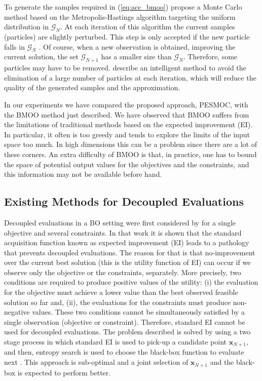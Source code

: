 \documentclass[review,preprint,12pt]{elsarticle}
\begin{document}
To generate the samples required in (\ref{eq:acc_bmoo}) \cite{feliot2015bayesian} propose a Monte Carlo method based
on the Metropolis-Hastings algorithm targeting the uniform distribution in $\mathcal{G}_{N}$. At each iteration of this 
algorithm the current samples (particles) are slightly perturbed. This step is only accepted if the new
particle falls in $\mathcal{G}_{N}$ . Of course, when a new observation is obtained, improving the current solution, 
the set $\mathcal{G}_{N+1}$ has a smaller size than $\mathcal{G}_{N}$. Therefore, some particles may have to be removed. 
\cite{feliot2015bayesian} describe an intelligent method to avoid the elimination of a large number of particles at each 
iteration, which will reduce the quality of the generated samples and the approximation.

In our experiments we have compared the proposed approach, PESMOC, with the BMOO method just described.
We have observed that BMOO suffers from the limitations of traditional methods based on the 
expected improvement (EI). In particular, it often is too greedy and tends to explore the limits of the 
input space too much. In high dimensions this can be a problem since there are a lot of these corners.  
An extra difficulty of BMOO is that, in practice, one has to bound the space of potential output values for the
objectives and the constraints, and this information may not be available before hand.

\subsection{Existing Methods for Decoupled Evaluations}

Decoupled evaluations in a BO setting were first considered by \cite{gelbart2014bayesian} 
for a single objective and several constraints. In that work it is shown that 
the standard acquisition function known as expected improvement
(EI) leads to a pathology that prevents decoupled evaluations. The reason for that is that 
no-improvement over the current best solution (this is the utility function of EI) can occur if we observe 
only the objective or the constraints, separately. More precisely, two conditions are required to produce 
positive values of the utility: (i) the evaluation for the objective must 
achieve a lower value than the best observed feasible solution so far and, (ii), the evaluations 
for the constraints must produce non-negative values. These two conditions 
cannot be simultaneously satisfied by a single observation (objective or constraint). 
Therefore, standard EI cannot be used for decoupled evaluations. The problem described is 
solved by using a two stage process in which standard EI is used to pick-up a candidate point 
$\mathbf{x}_{N+1}$, and then, entropy search is used to choose the black-box function to
evaluate next \citep{villemonteix2009informational}. This approach is 
sub-optimal and a joint selection of $\mathbf{x}_{N+1}$ and the black-box is expected to perform better.
\end{document}
